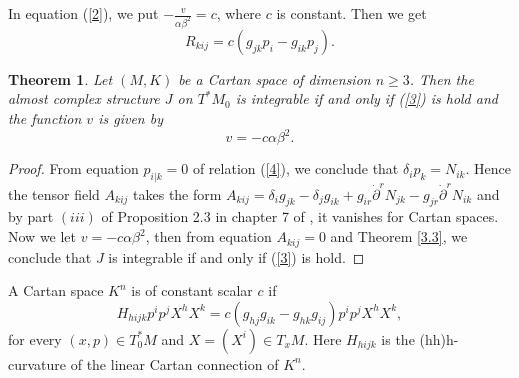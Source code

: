 \documentclass[10pt,a4paper]{article}
\theoremstyle{plain}
\newtheorem{theorem}{Theorem}[section]
\theoremstyle{definition}
\begin{document}
In equation (\ref{2}),  we put $-\frac{v}{\alpha\beta^2}=c$, where $c$
is constant. Then we get
\begin{equation}
R_{kij}=c(g_{jk}p_i-g_{ik}p_j).\label{3}
\end{equation}
\begin{theorem}\label{3.4}
Let $(M,K)$ be a Cartan space of dimension $n\geq 3$. Then the
almost complex structure $J$ on $T^{\ast}M_0$ is integrable if and
only if (\ref{3}) is hold and the function $v$ is given by
\begin{equation}
v=-c\alpha\beta^2.\label{constant}
\end{equation}
\end{theorem}
\begin{proof}
From equation $p_{i|k}=0$ of relation (\ref{4}), we conclude that
$\delta_ip_k=N_{ik}$. Hence the tensor field $A_{kij}$ takes the
form $A_{kij}=\delta_i g_{jk}-\delta_j
g_{ik}+g_{ir}{\dot{\partial}}^rN_{jk}-g_{jr}{\dot{\partial}}^rN_{ik}$
and by part $(iii)$ of Proposition 2.3 in chapter 7 of \cite{MirHri}, it
vanishes for Cartan spaces. Now we let $v=-c\alpha\beta^2$, then
from equation $A_{kij}=0$ and Theorem \ref{3.3}, we conclude that $J$
is integrable if and only if (\ref{3}) is hold.
\end{proof}
A Cartan space $K^n$ is of constant scalar $c$ if
\begin{equation}
H_{hijk}p^ip^jX^hX^k=c(g_{hj}g_{ik}-g_{hk}g_{ij})p^ip^jX^hX^k,\label{7}
\end{equation}
for every $(x,p)\in T^{\ast}_0M$ and $X=(X^i)\in T_xM$. Here
$H_{hijk}$ is the (hh)h-curvature of the linear Cartan connection of
$K^n$.
\end{document}
